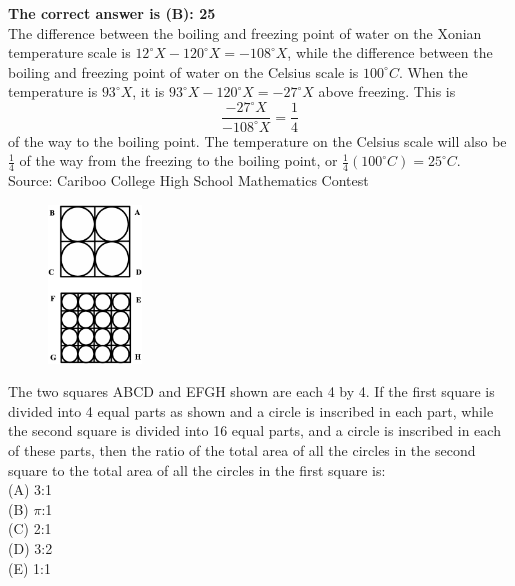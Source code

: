 \documentclass{article}
\begin{document}
\textbf{The correct answer is (B): 25}\\[1 ex]
The difference between the boiling and freezing point of water on the Xonian temperature scale is $12^{\circ}X-120^{\circ}X=-108^{\circ}X$, while the difference between the boiling and freezing point of water on the Celsius scale is $100^{\circ}C$. When the temperature is $93^{\circ}X$, it is $93^{\circ}X-120^{\circ}X=-27^{\circ}X$ above freezing. This is
\begin{equation*}
\frac{-27^{\circ}X}{-108^{\circ}X}=\frac{1}{4}
\end{equation*}
of the way to the boiling point. The temperature on the Celsius scale will also be $\frac{1}{4}$ of the way from the freezing to the boiling point, or $\frac{1}{4}(100^{\circ}C)=25^{\circ}C$.
\\[5 ex]

\scriptsize
Source: Cariboo College High School Mathematics Contest

\normalsize
\begin{figure}
	\includegraphics[width=25mm,viewport=66 28 464 700]{CCJPR74-20pic2.eps}
\end{figure}
The two squares ABCD and EFGH shown are each 4 by 4. If the first square is divided into 4 equal parts as shown and a circle is inscribed in each part, while the second square is divided into 16 equal parts, and a circle is inscribed in each of these parts, then the ratio of the total area of all the circles in the second square to the total area of all the circles in the first square is:\\
(A) 3:1\\
(B) $\pi$:1\\
(C) 2:1\\
(D) 3:2\\
(E) 1:1\\
\end{document}
